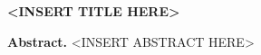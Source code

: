 \documentclass[a4paper]{article}
\begin{document}
\begin{center}
{\LARGE \textbf{<INSERT TITLE HERE>}}\\[1em]
\end{center}

\textbf{Abstract.} <INSERT ABSTRACT HERE>

\end{document}
